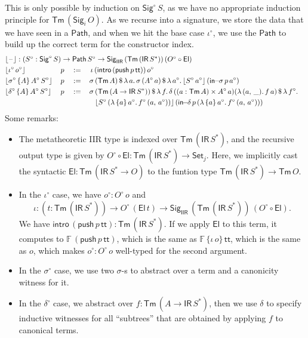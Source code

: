 \documentclass[acmsmall,screen,review]{acmart}
\newcommand{\msf}[1]{{\mathsf{#1}}}
\newcommand{\mbb}[1]{\mathbb{#1}}
\newcommand{\push}{\mathsf{push}}
\newcommand{\Set}{\msf{Set}}
\newcommand{\El}{\msf{El}}
\newcommand{\Sig}{\msf{Sig}}
\newcommand{\ttt}{\msf{tt}}
\newcommand{\blank}{{\mathord{\hspace{1pt}\text{--}\hspace{1pt}}}}
\newcommand{\IR}{\msf{IR}}
\newcommand{\intro}{\msf{intro}}
\newcommand{\IIR}{\msf{IIR}}
\newcommand{\floord}[1]{\lfloor #1 \rfloor}
\newcommand{\Tm}{\msf{Tm}}
\newcommand{\w}{\circ}
\newcommand{\Path}{\msf{Path}}
\newcommand{\insigma}{\msf{in}\!\!-\!\!\sigma}
\newcommand{\indelta}{\msf{in}\!\!-\!\!\delta}
\newcommand{\F}{\mbb{F}}
\begin{document}
\begin{definition}
This is only possible by induction on $\Sig^\w\,S$, as we have no appropriate induction principle
for $\Tm\,(\Sig_i\,O)$.  As we recurse into a signature, we store the data that we have seen in a
$\Path$, and when we hit the base case $\iota^\w$, we use the $\Path$ to build up the correct term
for the constructor index.
\begin{alignat*}{5}
  &\rlap{$\floord{\blank} : (S^\w : \Sig^\w\,S) \to \Path\,S^\w \to \Sig_\IIR\,(\Tm\,(\IR\,S^*))\,(O^\w\circ \El)$}\\
  &\floord{\iota^\w\,o^\w}\,&&p               &&:=\,&&\,\iota\,(\intro\,(\push\,p\,\ttt))\,o^\w\\
  &\floord{\sigma^\w\,\{A\}\,A^\w\,S^\w}\,&&p &&:=\,&&\sigma\,(\Tm\,A)\,\$\,\lambda\,a.\,\sigma\,(A^\w\,a)\,\$\,\lambda\,a^\w.\,\floord{S^\w\,a^\w}\,(\insigma\,p\,a^\w)\\
  &\floord{\delta^\w\,\{A\}\,A^\w\,S^\w}\,&&p &&:=\,&&\sigma\,(\Tm\,(A \to \IR\,S^*))\,\$\,\lambda\,f.\,\delta\,((a : \Tm\,A) \times A^\w\,a) (\lambda\,(a,\,\_).\,f\,a)\,\$\,\lambda\,f^\w.\\
  &                       &&              &&   &&\hspace{0.8em}\floord{S^\w\,(\lambda\,\{a\}\,a^\w.\,f^\w\,(a,\,a^\w))}\,(\indelta\,p\,(\lambda\,\{a\}\,a^\w.\,f^\w\,(a,\,a^\w)))
\end{alignat*}
Some remarks:
\begin{itemize}
  \item The metatheoretic IIR type is indexed over $\Tm\,(\IR\,S^*)$, and the recursive output type
    is given by $O^\w\circ \El : \Tm\,(\IR\,S^*) \to \Set_j$. Here, we implicitly cast the syntactic
    $\El : \Tm\,(\IR\,S^* \to O)$ to the funtion type $\Tm\,(\IR\,S^*) \to \Tm\,O$.
  \item In the $\iota^\w$ case, we have $o^\w : O^\w\,o$ and
    \[ \iota : (t : \Tm\,(\IR\,S^*)) \to O^\w\,(\El\,t) \to \Sig_\IIR\,(\Tm\,(\IR\,S^*))\,(O^\w\circ \El). \]
    We have $\intro\,(\push\,p\,\ttt) : \Tm\,(\IR\,S^*)$. If we apply $\El$ to this term, it computes
    to $\F\,(\push\,p\,\ttt)$, which is the same as $\F\,\{\iota\,o\}\,\ttt$, which is the same
    as $o$, which makes $o^\w : O^\w\,o$ well-typed for the second argument.
  \item In the $\sigma^\w$ case, we use two $\sigma$-s to abstract over a term and a canonicity witness for it.
  \item In the $\delta^\w$ case, we abstract over $f : \Tm\,(A \to \IR\,S^*)$, then we use $\delta$ to specify inductive
        witnesses for all ``subtrees'' that are obtained by applying $f$ to canonical terms.
\end{itemize}
\end{definition}
\end{document}
